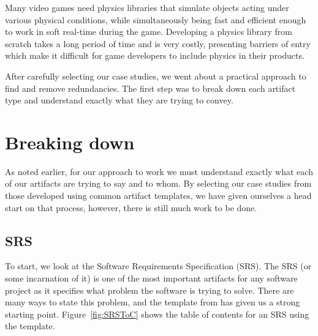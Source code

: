 \card{\gp}
{Many video games need physics libraries that simulate 
 objects acting under various physical conditions, while simultaneously being 
 fast and efficient enough to work in soft real-time during the game. 
 Developing a physics library from scratch takes a long period of time and is 
 very costly, presenting barriers of entry which make it difficult for game 
 developers to include physics in their products.}
{}

After carefully selecting our case studies, we went about a practical approach
to find and remove redundancies. The first step was to break down each artifact
type and understand exactly what they are trying to convey.


\section{Breaking down \sfs}
\label{sec:breakdown}

As noted earlier, for our approach to work we must understand exactly what each
of our artifacts are trying to say and to whom. By selecting our case studies 
from those developed using common artifact templates, we have given ourselves a
head start on that process, however, there is still much work to be done.

\subsection{SRS}

To start, we look at the Software Requirements Specification (SRS). The SRS
(or some incarnation of it) is one of the most important artifacts for any
software project as it specifies what problem the software is trying to solve.
There are many ways to state this problem, and the template from \smithea{} has 
given us a strong starting point. Figure~\ref{fig:SRSToC} shows the table of 
contents for an SRS using the \smithea{} template.

